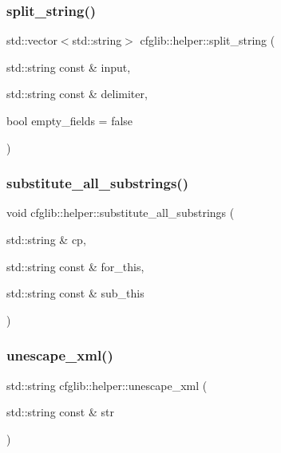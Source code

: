 \subsubsection{\texorpdfstring{split\+\_\+string()}{split\_string()}}
{\footnotesize\ttfamily std\+::vector$<$std\+::string$>$ cfglib\+::helper\+::split\+\_\+string (\begin{DoxyParamCaption}\item[{std\+::string const \&}]{input,  }\item[{std\+::string const \&}]{delimiter,  }\item[{bool}]{empty\+\_\+fields = {\ttfamily false} }\end{DoxyParamCaption})\hspace{0.3cm}{\ttfamily [inline]}}

\mbox{\label{namespacecfglib_1_1helper_a881befb2313de589fc1f352316fa139f}} 
\subsubsection{\texorpdfstring{substitute\+\_\+all\+\_\+substrings()}{substitute\_all\_substrings()}}
{\footnotesize\ttfamily void cfglib\+::helper\+::substitute\+\_\+all\+\_\+substrings (\begin{DoxyParamCaption}\item[{std\+::string \&}]{cp,  }\item[{std\+::string const \&}]{for\+\_\+this,  }\item[{std\+::string const \&}]{sub\+\_\+this }\end{DoxyParamCaption})\hspace{0.3cm}{\ttfamily [inline]}}

\mbox{\label{namespacecfglib_1_1helper_a4bde730048efc8d68682f368b010f18d}} 
\subsubsection{\texorpdfstring{unescape\+\_\+xml()}{unescape\_xml()}}
{\footnotesize\ttfamily std\+::string cfglib\+::helper\+::unescape\+\_\+xml (\begin{DoxyParamCaption}\item[{std\+::string const \&}]{str }\end{DoxyParamCaption})\hspace{0.3cm}{\ttfamily [inline]}}

